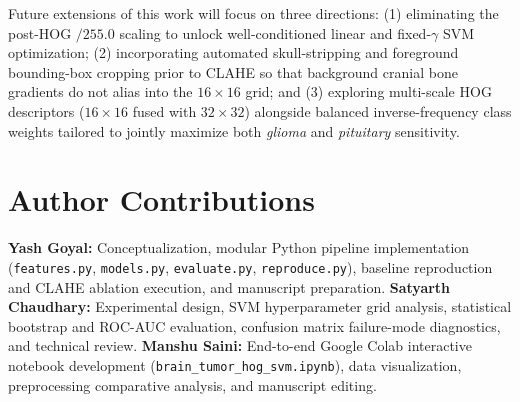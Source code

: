 \documentclass[conference]{IEEEtran}
\begin{document}
Future extensions of this work will focus on three directions: (1) eliminating the post-HOG $/255.0$ scaling to unlock well-conditioned linear and fixed-$\gamma$ SVM optimization; (2) incorporating automated skull-stripping and foreground bounding-box cropping prior to CLAHE so that background cranial bone gradients do not alias into the $16 \times 16$ grid; and (3) exploring multi-scale HOG descriptors ($16 \times 16$ fused with $32 \times 32$) alongside balanced inverse-frequency class weights tailored to jointly maximize both \emph{glioma} and \emph{pituitary} sensitivity.

\section*{Author Contributions}
\textbf{Yash Goyal:} Conceptualization, modular Python pipeline implementation (\texttt{features.py}, \texttt{models.py}, \texttt{evaluate.py}, \texttt{reproduce.py}), baseline reproduction and CLAHE ablation execution, and manuscript preparation.
\textbf{Satyarth Chaudhary:} Experimental design, SVM hyperparameter grid analysis, statistical bootstrap and ROC-AUC evaluation, confusion matrix failure-mode diagnostics, and technical review.
\textbf{Manshu Saini:} End-to-end Google Colab interactive notebook development (\texttt{brain\_tumor\_hog\_svm.ipynb}), data visualization, preprocessing comparative analysis, and manuscript editing.
\end{document}
